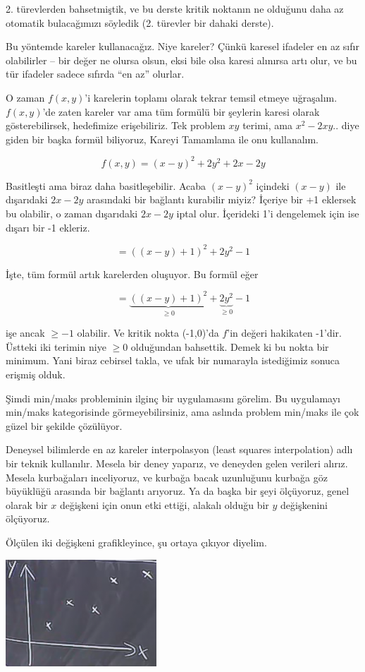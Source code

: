 \documentclass[12pt,fleqn]{article}\usepackage{../../common}
\begin{document}
2. türevlerden bahsetmiştik, ve bu derste kritik noktanın ne olduğunu daha
az otomatik bulacağımızı söyledik (2. türevler bir dahaki derste). 

Bu yöntemde kareler kullanacağız. Niye kareler? Çünkü karesel ifadeler en
az sıfır olabilirler -- bir değer ne olursa olsun, eksi bile olsa karesi
alınırsa artı olur, ve bu tür ifadeler sadece sıfırda ``en az'' olurlar.

O zaman $f(x,y)$'i karelerin toplamı olarak tekrar temsil etmeye
uğraşalım. $f(x,y)$'de zaten kareler var ama tüm formülü bir şeylerin
karesi olarak gösterebilirsek, hedefimize erişebiliriz. Tek problem $xy$
terimi, ama $x^2 - 2xy..$ diye giden bir başka formül biliyoruz, Kareyi
Tamamlama ile onu kullanalım.

$$ f(x,y) = (x-y)^2 + 2y^2 + 2x - 2y $$

Basitleşti ama biraz daha basitleşebilir. Acaba $(x-y)^2$ içindeki $(x-y)$
ile dışarıdaki $2x - 2y$ arasındaki bir bağlantı kurabilir miyiz? İçeriye
bir +1 eklersek bu olabilir, o zaman dışarıdaki $2x - 2y$ iptal
olur. İçerideki 1'i dengelemek için ise dışarı bir -1 ekleriz.

$$  = ((x-y) + 1)^2 + 2y^2 - 1$$

İşte, tüm formül artık karelerden oluşuyor. Bu formül eğer 

$$  = \underbrace{((x-y) + 1)^2}_{\ge 0} + \underbrace{2y^2}_{\ge 0} - 1$$

işe ancak $\ge -1$ olabilir. Ve kritik nokta (-1,0)'da $f$'in değeri hakikaten
-1'dir. Üstteki iki terimin niye $\ge 0$ olduğundan bahsettik. Demek ki bu nokta
bir minimum.  Yani biraz cebirsel takla, ve ufak bir numarayla istediğimiz
sonuca erişmiş olduk.

Şimdi min/maks probleminin ilginç bir uygulamasını görelim. Bu uygulamayı
min/maks kategorisinde görmeyebilirsiniz, ama aslında problem min/maks ile
çok güzel bir şekilde çözülüyor.

Deneysel bilimlerde en az kareler interpolasyon (least squares interpolation)
adlı bir teknik kullanılır. Mesela bir deney yaparız, ve deneyden gelen verileri
alırız. Mesela kurbağaları inceliyoruz, ve kurbağa bacak uzunluğunu kurbağa göz
büyüklüğü arasında bir bağlantı arıyoruz. Ya da başka bir şeyi ölçüyoruz, genel
olarak bir $x$ değişkeni için onun etki ettiği, alakalı olduğu bir $y$
değişkenini ölçüyoruz.

Ölçülen iki değişkeni grafikleyince, şu ortaya çıkıyor diyelim.

\begin{center}
\includegraphics[height=4cm]{9_5.png}
\end{center}
\end{document}
